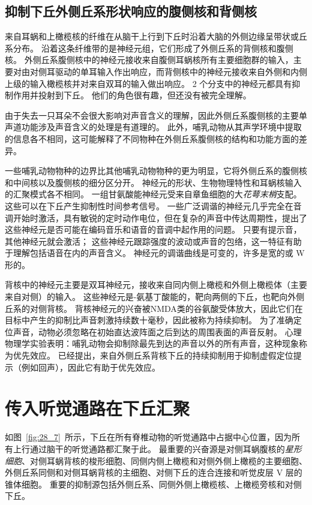 \subsection{抑制下丘外侧丘系形状响应的腹侧核和背侧核}

来自耳蜗和上橄榄核的纤维在从脑干上行到下丘时沿着大脑的外侧边缘呈带状或丘系分布。
沿着这条纤维带的是神经元组，它们形成了外侧丘系的背侧核和腹侧核。
外侧丘系腹侧核中的神经元接收来自腹侧耳蜗核所有主要细胞群的输入，主要对由对侧耳驱动的单耳输入作出响应，而背侧核中的神经元接收来自外侧和内侧上级的输入橄榄核并对来自双耳的输入做出响应。
2 个分支中的神经元都具有抑制作用并投射到下丘。
他们的角色很有趣，但还没有被完全理解。


由于失去一只耳朵不会很大影响对声音含义的理解，因此外侧丘系腹侧核的主要单声道功能涉及声音含义的处理是有道理的。
此外，哺乳动物从其声学环境中提取的信息各不相同，这可能解释了不同物种在外侧丘系腹侧核的结构和功能方面的差异。


一些哺乳动物物种的边界比其他哺乳动物物种的更为明显，它将外侧丘系的腹侧核和中间核以及腹侧核的细分区分开。
神经元的形状、生物物理特性和耳蜗核输入的汇聚模式各不相同。
一组甘氨酸能神经元受来自章鱼细胞的大\textit{花萼末梢}支配。 
这些可以在下丘产生抑制性时间参考信号。
一些广泛调谐的神经元几乎完全在音调开始时激活，具有敏锐的定时动作电位，但在复杂的声音中传达周期性，提出了这些神经元是否可能在编码音乐和语音的音调中起作用的问题。
只要有提示音，其他神经元就会激活； 
这些神经元跟踪强度的波动或声音的包络，这一特征有助于理解包括语音在内的声音含义。
神经元的调谐曲线是可变的，许多是宽的或 W 形的。


背核中的神经元主要是双耳神经元，接收来自同内侧上橄榄和外侧上橄榄体（主要来自对侧）的输入。
这些神经元是\ce{$\gamma$}-氨基丁酸能的，靶向两侧的下丘，也靶向外侧丘系的对侧背核。
背核神经元的兴奋被NMDA类的谷氨酸受体放大，因此它们在目标中产生的抑制比声音刺激持续数十毫秒，因此被称为持续抑制。
为了准确定位声音，动物必须忽略在初始直达波阵面之后到达的周围表面的声音反射。
心理物理学实验表明：哺乳动物会抑制除最先到达的声音以外的所有声音，这种现象称为优先效应。
已经提出，来自外侧丘系背核下丘的持续抑制用于抑制虚假定位提示（例如回声），因此它有助于优先效应。



\section{传入听觉通路在下丘汇聚}

如图~\ref{fig:28_7}~所示，下丘在所有脊椎动物的听觉通路中占据中心位置，因为所有上行通过脑干的听觉通路都汇聚于此。
最重要的兴奋源是对侧耳蜗腹核的\textit{星形细胞}、对侧耳蜗背核的梭形细胞、同侧内侧上橄榄和对侧外侧上橄榄的主要细胞、外侧丘系同侧和对侧耳蜗背核的主细胞、对侧下丘的连合连接和听觉皮层 V 层的锥体细胞。
重要的抑制源包括外侧丘系、同侧外侧上橄榄核、上橄榄旁核和对侧下丘。


